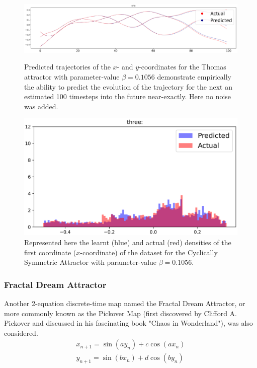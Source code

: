 \begin{figure}[ht]
  \centering
  \includegraphics[scale=0.35]{Graphs/_Thomas_1.eps}\caption*{Predicted trajectories of the $x$- and $y$-coordinates for the Thomas attractor with parameter-value $\beta=0.1056$ demonstrate empirically the ability to predict the evolution of the trajectory for the next an estimated 100 timesteps into the future near-exactly. Here no noise was added.}
  \includegraphics[scale=0.5]{Graphs/_Thomas_3.eps}\caption*{Represented here the learnt (blue) and actual (red) densities of the first coordinate ($x$-coordinate) of the dataset for the Cyclically Symmetric Attractor with parameter-value $\beta=0.1056$.}
\end{figure}


\subsubsection{Fractal Dream Attractor}

Another 2-equation discrete-time map named the Fractal Dream Attractor, or more commonly known as the Pickover Map (first discovered by Clifford A. Pickover and discussed in his fascinating book "Chaos in Wonderland"\cite{PickoverChaos}), was also considered.
\begin{eqnarray}\label{eqns_clifford}
  {x_{n+1}=\sin(ay_n) + c\cos(ax_n)} \\
  {y_{n+1}=\sin(bx_n)+d\cos(by_n)}
\end{eqnarray}

